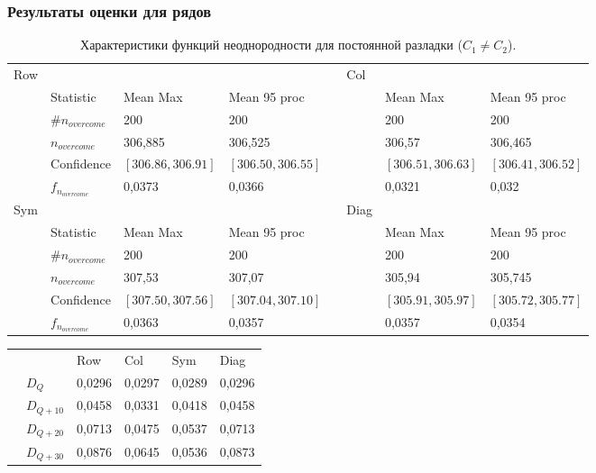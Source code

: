 \documentclass[11pt]{beamer}
\begin{document}
	\begin{frame}
		\frametitle{Результаты оценки для рядов}
		\tiny
		\begin{table}[!hhh]
			\caption{Характеристики функций неоднородности для постоянной разладки ($ C_1 \neq C_2 $).}
			\begin{tabular}{llllllll}
				Row & 				   & 		  	  & 			 && Col & 		      & 			      \\
				& Statistic        & Mean Max 	  & Mean 95 proc && 	& Mean Max     & Mean 95 proc     \\
				& $\#n_{overcome}$ & 200 	  	  & 200 		 &&     & 200 	      & 200 			  \\
				& $n_{overcome}$   & 306,885   	  & 306,525      &&     & 306,57       & 306,465 		  \\
				& Confidence       & $[306.86, 306.91]$& $[306.50, 306.55]$&&     & $[306.51, 306.63]$ & $[306.41, 306.52]$     \\
				&$f_{n_{overcome}}$& 0,0373		  &	0,0366		 &&     & 0,0321  &   0,032          \\
				Sym & 				   & 		  	  & 			 && Diag& 		      & 			      \\
				& Statistic        & Mean Max 	  & Mean 95 proc && 	& Mean Max     & Mean 95 proc     \\
				& $\#n_{overcome}$ & 200 	  	  & 200 		 &&     & 200 	      & 200 			  \\
				& $n_{overcome}$   & 307,53   	  & 307,07      &&     & 305,94      & 305,745 		  \\
				& Confidence       & $[307.50, 307.56]$ & $[307.04, 307.10]$ &&     & $[305.91, 305.97]$ & $[305.72, 305.77]$     \\
				&$f_{n_{overcome}}$& 0,0363		  &	0,0357		 &&     & 0,0357		 &0,0354          \\
			\end{tabular}
		\end{table}
		\begin{table}[!hhh]
			\begin{tabular}{llllll}
				&              & Row 	  & Col 	& Sym    & Diag  \\
				& $D_Q$        & 0,0296	  & 0,0297 	& 0,0289 & 0,0296		\\
				& $D_{Q+10}$   & 0,0458   & 0,0331  & 0,0418 & 0,0458	\\
				& $D_{Q+20}$   & 0,0713   & 0,0475  & 0,0537 & 0,0713	\\
				& $D_{Q+30}$   & 0,0876	  &	0,0645	& 0,0536 & 0,0873	
			\end{tabular}
		\end{table}
	\end{frame}
\end{document}
